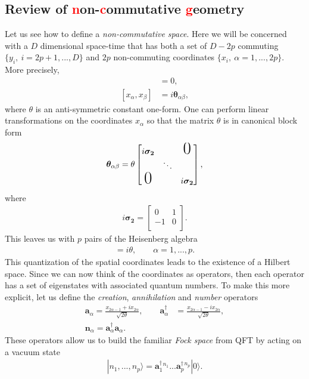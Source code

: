     \subsection{Review of \textcolor{red}{n}on-\textcolor{red}{c}ommutative \textcolor{red}{g}eometry}
    Let us see how to define a \textit{non-commutative space}. Here we will be concerned with a $D$ dimensional space-time that has both a set of $D-2p$ commuting $\{ y_i, \ i=2p+1,...,D\}$ and $2p$ non-commuting coordinates $\{ x_i, \ \alpha =1,...,2p\}$. More precisely,
    \begin{align}
        [y_i, y_j] &=0,\\
        [x_{\alpha}, x_{\beta}] &=i \bm{\theta}_{\alpha \beta}, \label{eq:space_time_commutations}
    \end{align}
    where $\theta$ is an anti-symmetric constant one-form. One can perform linear transformations on the coordinates $x_{\alpha}$ so that the matrix $\theta$ is in canonical block form
    \begin{align}
        \bm{\theta}_{\alpha \beta } = \theta \begin{bmatrix}
            i \bm{\sigma_2} &  & \text{\huge0} \\
                     & \ddots &  \\
                    \text{\huge0} &  & i \bm{\sigma_2} \\
                \end{bmatrix},
    \end{align}
    where 
    \begin{align}
        i \bm{\sigma_2} = \begin{bmatrix}
            0 & 1 \\
            -1 & 0 \\
        \end{bmatrix}.
    \end{align}
    This leaves us with $p$ pairs of the Heisenberg algebra
    \begin{align}
        [x_{2\alpha -1}, x_{2\alpha}]=i\theta, \qquad \alpha=1,...,p.
    \end{align}
    This quantization of the spatial coordinates leads to the existence of a Hilbert space. Since we can now think of the coordinates as operators, then each operator has a set of eigenstates with associated quantum numbers. To make this more explicit, let us define the \textit{creation}, \textit{annihilation} and \textit{number} operators
    \begin{align}
        \bm{a}_{\alpha} = \frac{x_{2\alpha-1} +i x_{2\alpha}}{\sqrt{2 \theta}}, \qquad \bm{a}^{\dag}_{\alpha} &= \frac{x_{2\alpha-1} -i x_{2\alpha}}{\sqrt{2 \theta}}, \\
        \bm{n}_{\alpha} = \bm{a}^{\dag}_{\alpha}\bm{a}_{\alpha}.
    \end{align}
    These operators allow us to build the familiar \textit{Fock space} from QFT by acting on a vacuum state
    \begin{align}
        |n_1,...,n_p\rangle=  \bm{a}^{\dag}_1^{n_1}... \bm{a}^{\dag}_p^{n_p}|0\rangle.
    \end{align}

